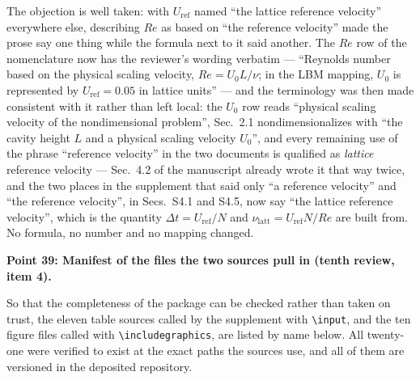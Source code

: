 \documentclass[11pt,a4paper]{article}
\begin{document}
The objection is well taken: with $U_{\mathrm{ref}}$ named ``the lattice reference
velocity'' everywhere else, describing $Re$ as based on ``the reference velocity'' made
the prose say one thing while the formula next to it said another. The $Re$ row of the
nomenclature now has the reviewer's wording verbatim --- ``Reynolds number based on the
physical scaling velocity, $Re=U_0L/\nu$; in the LBM mapping, $U_0$ is represented by
$U_{\mathrm{ref}}=0.05$ in lattice units'' --- and the terminology was then made
consistent with it rather than left local: the $U_0$ row reads ``physical scaling
velocity of the nondimensional problem'', Sec.~2.1 nondimensionalizes with ``the cavity
height $L$ and a physical scaling velocity $U_0$'', and every remaining use of the
phrase ``reference velocity'' in the two documents is qualified as \emph{lattice}
reference velocity --- Sec.~4.2 of the manuscript already wrote it that way twice, and the
two places in the supplement that said only ``a reference velocity'' and ``the reference
velocity'', in Secs.~S4.1 and S4.5, now say ``the lattice reference velocity'', which is
the quantity $\Delta t=U_{\mathrm{ref}}/N$ and $\nu_{\mathrm{latt}}=U_{\mathrm{ref}}N/Re$
are built from. No formula, no number and no mapping changed.

\vspace{1em}

\noindent\textbf{Point 39: Manifest of the files the two sources pull in (tenth review,
item 4).}

So that the completeness of the package can be checked rather than taken on trust, the
eleven table sources called by the supplement with \texttt{\textbackslash input}, and the ten
figure files called with \texttt{\textbackslash includegraphics}, are listed by name below. All
twenty-one were verified to exist at the exact paths the sources use, and all of them are
versioned in the deposited repository.
\end{document}

